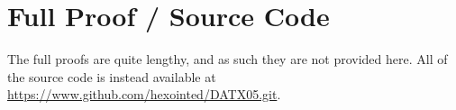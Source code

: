 \chapter{Full Proof / Source Code}

	The full proofs are quite lengthy, and as such they are not provided here.
	All of the source code is instead available at
	\url{https://www.github.com/hexointed/DATX05.git}.
